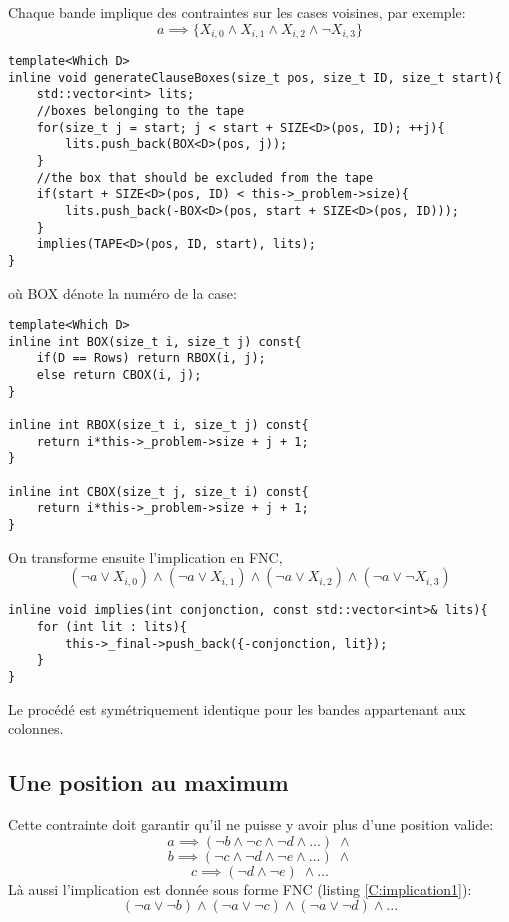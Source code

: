 \documentclass[a4paper,12pt]{report}
\begin{document}
Chaque bande implique des contraintes sur les cases voisines, par exemple:
$$a \implies \{X_{i,0} \wedge X_{i,1} \wedge X_{i,2} \wedge \lnot X_{i,3}\}$$
\lstset{style=Cpp, caption=Une bande en FNC, label=C:Boxes}
\begin{lstlisting}[mathescape=true]
template<Which D>
inline void generateClauseBoxes(size_t pos, size_t ID, size_t start){
	std::vector<int> lits;
	//boxes belonging to the tape
	for(size_t j = start; j < start + SIZE<D>(pos, ID); ++j){
		lits.push_back(BOX<D>(pos, j));
	}
	//the box that should be excluded from the tape
	if(start + SIZE<D>(pos, ID) < this->_problem->size){
		lits.push_back(-BOX<D>(pos, start + SIZE<D>(pos, ID)));
	}
	implies(TAPE<D>(pos, ID, start), lits);
}
\end{lstlisting}
où BOX dénote la numéro de la case:
\lstset{style=Cpp, caption=Case, label=C:BOX}
\begin{lstlisting}[mathescape=true]
template<Which D>
inline int BOX(size_t i, size_t j) const{
	if(D == Rows) return RBOX(i, j);
	else return CBOX(i, j);
}

inline int RBOX(size_t i, size_t j) const{
	return i*this->_problem->size + j + 1;
}

inline int CBOX(size_t j, size_t i) const{
	return i*this->_problem->size + j + 1;
}
\end{lstlisting}

On transforme ensuite l'implication en FNC,
$$(\lnot a \vee X_{i,0}) \wedge ( \lnot a \vee X_{i,1}) \wedge ( \lnot a \vee X_{i,2}) \wedge (\lnot a \vee \lnot X_{i,3})$$
\lstset{style=Cpp, caption=Implication en FNC, label=C:implication1}
\begin{lstlisting}[mathescape=true]
inline void implies(int conjonction, const std::vector<int>& lits){
	for (int lit : lits){
		this->_final->push_back({-conjonction, lit});
	}
}
\end{lstlisting}

Le procédé est symétriquement identique pour les bandes appartenant aux colonnes.

\subsection{Une position au maximum}
Cette contrainte doit garantir qu'il ne puisse y avoir plus d'une position valide:
$$a \implies (\lnot b \wedge \lnot c \wedge \lnot d \wedge ... )\; \wedge$$
$$b \implies (\lnot c \wedge \lnot d \wedge \lnot e \wedge ... )\; \wedge$$
$$c \implies (\lnot d \wedge \lnot e)\; \wedge ...$$
Là aussi l'implication est donnée sous forme FNC (listing \ref{C:implication1}): 
$$(\lnot a \vee \lnot b) \wedge (\lnot a \vee \lnot c) \wedge (\lnot a \vee \lnot d) \wedge ...$$
\end{document}
